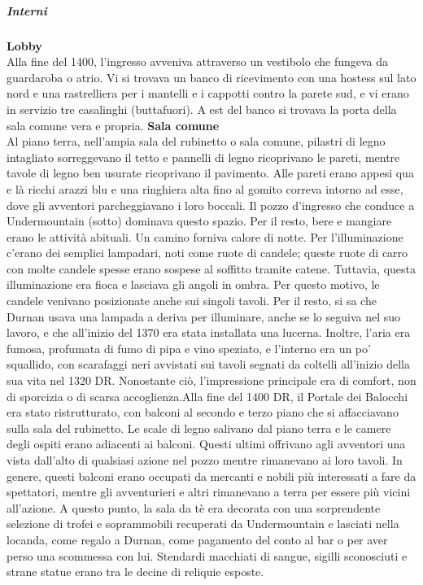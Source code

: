 \documentclass{article}
\begin{document}
                                          \subparagraph{Interni}
                    \textbf{Lobby} \\ Alla fine del 1400, l'ingresso avveniva attraverso un vestibolo che fungeva da guardaroba o atrio. Vi si trovava un banco di ricevimento con una hostess sul lato nord e una rastrelliera per i mantelli e i cappotti contro la parete sud, e vi erano in servizio tre casalinghi (buttafuori). A est del banco si trovava la porta della sala comune vera e propria.
                    \textbf{Sala comune} \\ Al piano terra, nell'ampia sala del rubinetto o sala comune, pilastri di legno intagliato sorreggevano il tetto e pannelli di legno ricoprivano le pareti, mentre tavole di legno ben usurate ricoprivano il pavimento. Alle pareti erano appesi qua e là ricchi arazzi blu e una ringhiera alta fino al gomito correva intorno ad esse, dove gli avventori parcheggiavano i loro boccali. Il pozzo d'ingresso che conduce a Undermountain (sotto) dominava questo spazio. Per il resto, bere e mangiare erano le attività abituali. Un camino forniva calore di notte.
                    Per l'illuminazione c'erano dei semplici lampadari, noti come ruote di candele; queste ruote di carro con molte candele spesse erano sospese al soffitto tramite catene. Tuttavia, questa illuminazione era fioca e lasciava gli angoli in ombra. Per questo motivo, le candele venivano posizionate anche sui singoli tavoli. Per il resto, si sa che Durnan usava una lampada a deriva per illuminare, anche se lo seguiva nel suo lavoro, e che all'inizio del 1370 era stata installata una lucerna. Inoltre, l'aria era fumosa, profumata di fumo di pipa e vino speziato, e l'interno era un po' squallido, con scarafaggi neri avvistati sui tavoli segnati da coltelli all'inizio della sua vita nel 1320 DR. Nonostante ciò, l'impressione principale era di comfort, non di sporcizia o di scarsa accoglienza.Alla fine del 1400 DR, il Portale dei Balocchi era stato ristrutturato, con balconi al secondo e terzo piano che si affacciavano sulla sala del rubinetto. Le scale di legno salivano dal piano terra e le camere degli ospiti erano adiacenti ai balconi. Questi ultimi offrivano agli avventori una vista dall'alto di qualsiasi azione nel pozzo mentre rimanevano ai loro tavoli. In genere, questi balconi erano occupati da mercanti e nobili più interessati a fare da spettatori, mentre gli avventurieri e altri rimanevano a terra per essere più vicini all'azione. A questo punto, la sala da tè era decorata con una sorprendente selezione di trofei e soprammobili recuperati da Undermountain e lasciati nella locanda, come regalo a Durnan, come pagamento del conto al bar o per aver perso una scommessa con lui. Stendardi macchiati di sangue, sigilli sconosciuti e strane statue erano tra le decine di reliquie esposte.
\end{document}
